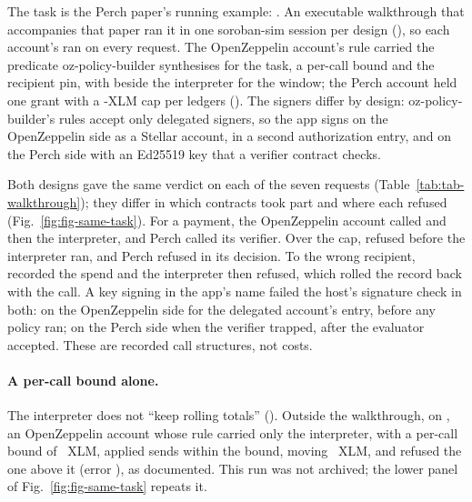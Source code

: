 The task is the Perch paper's running example: . An executable
walkthrough that accompanies that paper ran it in one soroban-sim session per
design (), so each account's  ran on every
request. The OpenZeppelin  account's rule carried the predicate
oz-policy-builder synthesises for the task, a per-call bound and the recipient
pin, with  beside the interpreter for the window; the Perch
account held one grant with a -XLM cap per
 ledgers (). The signers
differ by design: oz-policy-builder's rules accept only delegated signers, so the
app signs on the OpenZeppelin side as a Stellar account, in a second
authorization entry, and on the Perch side with an Ed25519 key that a verifier
contract checks.

Both designs gave the same verdict on each of the seven requests
(Table~\ref{tab:tab-walkthrough}); they differ in which contracts took part and
where each refused (Fig.~\ref{fig:fig-same-task}). For a payment, the
OpenZeppelin account called  and then the interpreter, and
Perch called its verifier. Over the cap,  refused before the
interpreter ran, and Perch refused in its decision. To the wrong recipient,
 recorded the spend and the interpreter then refused, which
rolled the record back with the call. A key signing in the app's name failed the
host's signature check in both: on the OpenZeppelin side for the delegated
account's entry, before any policy ran; on the Perch side when the verifier
trapped, after the evaluator accepted. These are recorded call structures, not
costs.


\paragraph{A per-call bound alone.} The interpreter does not ``keep rolling
totals'' (). Outside the walkthrough, on
, an OpenZeppelin account whose rule carried only the
interpreter, with a per-call bound of ~XLM, applied
 sends within the bound, moving
~XLM, and refused the one above it
(error ), as documented. This run was not archived; the
lower panel of Fig.~\ref{fig:fig-same-task} repeats it.

